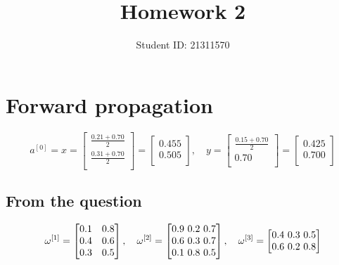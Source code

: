\documentclass{article}
\title{Homework 2}
\author{Student ID: 21311570}
\begin{document}
\maketitle

\section{Forward propagation}

\[
    a^{[0]} = x = \begin{bmatrix}
        \frac{0.21+0.70}{2} \\
        \frac{0.31+0.70}{2} \\
    \end{bmatrix}
    = \begin{bmatrix}
        0.455 \\
        0.505 \\
    \end{bmatrix},
    \quad
    y = \begin{bmatrix}
        \frac{0.15+0.70}{2} \\
        0.70                \\
    \end{bmatrix}
    = \begin{bmatrix}
        0.425 \\
        0.700 \\
    \end{bmatrix}
\]

\subsection{From the question}

\[
    \omega^{[1]} = \begin{bmatrix}
        0.1 & 0.8 \\
        0.4 & 0.6 \\
        0.3 & 0.5 \\
    \end{bmatrix},
    \quad
    \omega^{[2]} = \begin{bmatrix}
        0.9 $ 0.2 $ 0.7 \\
        0.6 $ 0.3 $ 0.7 \\
        0.1 $ 0.8 $ 0.5 \\
    \end{bmatrix},
    \quad
    \omega^{[3]} = \begin{bmatrix}
        0.4 $ 0.3 $ 0.5 \\
        0.6 $ 0.2 $ 0.8 \\
    \end{bmatrix}
\]
\end{document}
